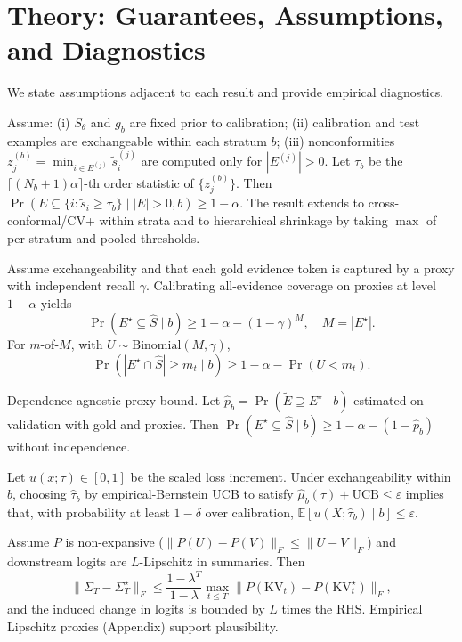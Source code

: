 \documentclass[11pt]{article}
\begin{document}
\section{Theory: Guarantees, Assumptions, and Diagnostics}
We state assumptions adjacent to each result and provide empirical diagnostics.

\begin{theorem}
\label{thm:coverage}
Assume: (i) $S_\theta$ and $g_b$ are fixed prior to calibration; (ii) calibration and test examples are exchangeable within each stratum $b$; (iii) nonconformities $z_j^{(b)}=\min_{i\in E^{(j)}} \tilde{s}_i^{(j)}$ are computed only for $|E^{(j)}|>0$. Let $\tau_b$ be the $\lceil (N_b+1)\alpha\rceil$-th order statistic of $\{z_j^{(b)}\}$. Then $\Pr(E\subseteq \{i:\tilde{s}_i\ge \tau_b\}\mid |E|>0,b)\ge 1-\alpha$. The result extends to cross-conformal/CV+ within strata and to hierarchical shrinkage by taking $\max$ of per-stratum and pooled thresholds.
\end{theorem}

\begin{theorem}
\label{thm:proxy}
Assume exchangeability and that each gold evidence token is captured by a proxy with independent recall $\gamma$. Calibrating all-evidence coverage on proxies at level $1-\alpha$ yields
\[
\Pr(E^\star\subseteq \hat{S}\mid b) \ge 1-\alpha-(1-\gamma)^M,\quad M=|E^\star|.
\]
For $m$-of-$M$, with $U\sim \text{Binomial}(M,\gamma)$,
\[
\Pr(|E^\star\cap \hat{S}|\ge m_t\mid b) \ge 1-\alpha-\Pr(U<m_t).
\]
\end{theorem}

\noindent Dependence-agnostic proxy bound. Let $\hat{p}_b=\Pr(\tilde{E}\supseteq E^\star\mid b)$ estimated on validation with gold and proxies. Then $\Pr(E^\star\subseteq \hat{S}\mid b)\ge 1-\alpha-(1-\hat{p}_b)$ without independence.

\begin{theorem}\label{thm:crc}
Let $u(x;\tau)\in[0,1]$ be the scaled loss increment. Under exchangeability within $b$, choosing $\hat{\tau}_b$ by empirical-Bernstein UCB to satisfy $\hat{\mu}_b(\tau)+\mathrm{UCB}\le \varepsilon$ implies that, with probability at least $1-\delta$ over calibration, $\mathbb{E}[u(X;\hat{\tau}_b)\mid b]\le \varepsilon$.
\end{theorem}

\begin{theorem}
Assume $P$ is non-expansive ($\|P(U)-P(V)\|_F \le \|U-V\|_F$) and downstream logits are $L$-Lipschitz in summaries. Then
\[
\|\Sigma_T - \Sigma_T^\star\|_F \le \frac{1-\lambda^T}{1-\lambda} \max_{t\le T}\|P(\text{KV}_t) - P(\text{KV}^\star_t)\|_F,
\]
and the induced change in logits is bounded by $L$ times the RHS. Empirical Lipschitz proxies (Appendix) support plausibility.
\end{theorem}
\end{document}
